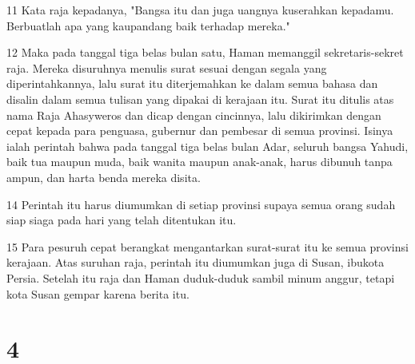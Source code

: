 \par 11 Kata raja kepadanya, "Bangsa itu dan juga uangnya kuserahkan kepadamu. Berbuatlah apa yang kaupandang baik terhadap mereka."
\par 12 Maka pada tanggal tiga belas bulan satu, Haman memanggil sekretaris-sekret raja. Mereka disuruhnya menulis surat sesuai dengan segala yang diperintahkannya, lalu surat itu diterjemahkan ke dalam semua bahasa dan disalin dalam semua tulisan yang dipakai di kerajaan itu. Surat itu ditulis atas nama Raja Ahasyweros dan dicap dengan cincinnya, lalu dikirimkan dengan cepat kepada para penguasa, gubernur dan pembesar di semua provinsi. Isinya ialah perintah bahwa pada tanggal tiga belas bulan Adar, seluruh bangsa Yahudi, baik tua maupun muda, baik wanita maupun anak-anak, harus dibunuh tanpa ampun, dan harta benda mereka disita.
\par 14 Perintah itu harus diumumkan di setiap provinsi supaya semua orang sudah siap siaga pada hari yang telah ditentukan itu.
\par 15 Para pesuruh cepat berangkat mengantarkan surat-surat itu ke semua provinsi kerajaan. Atas suruhan raja, perintah itu diumumkan juga di Susan, ibukota Persia. Setelah itu raja dan Haman duduk-duduk sambil minum anggur, tetapi kota Susan gempar karena berita itu.

\chapter{4}

